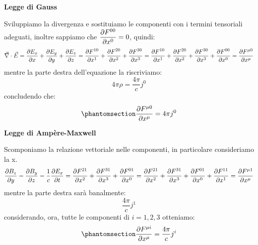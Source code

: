 \textbf{Legge di Gauss}

Sviluppiamo la divergenza e sostituiamo le componenti con i termini tensoriali adeguati, inoltre sappiamo che $\dfrac{\partial F\indices{^{00}}}{\partial x^0}=0$, quindi:
\begin{equation*}
    \Vec{\nabla}\cdot\Vec{E}=\dfrac{\partial E_x}{\partial x}+\dfrac{\partial E_y}{\partial y}+\dfrac{\partial E_z}{\partial z}=\dfrac{\partial F\indices{^{10}}}{\partial x^1}+\dfrac{\partial F\indices{^{20}}}{\partial x^2}+\dfrac{\partial F\indices{^{30}}}{\partial x^3}=\dfrac{\partial F\indices{^{10}}}{\partial x^1}+\dfrac{\partial F\indices{^{20}}}{\partial x^2}+\dfrac{\partial F\indices{^{30}}}{\partial x^3}+\dfrac{\partial F\indices{^{00}}}{\partial x^0}=\dfrac{\partial F\indices{^{\mu0}}}{\partial x^\mu}
\end{equation*} 
mentre la parte destra dell'equazione la riscriviamo:
\begin{equation*}
    4\pi\rho=\dfrac{4\pi}{c}j^0
\end{equation*} 
concludendo che:
\begin{equation}\phantomsection\label{eq:leg_gauss}
    \dfrac{\partial F\indices{^{\mu0}}}{\partial x^\mu}=4\pi j^0
\end{equation} 

\textbf{Legge di Ampère-Maxwell}

Scomponiamo la relazione vettoriale nelle componenti, in particolare consideriamo la x.
\begin{equation*}
   \dfrac{\partial B_z}{\partial y}-\dfrac{\partial B_y}{\partial z}-\dfrac{1}{c}\dfrac{\partial E_x}{\partial t}=\dfrac{\partial F\indices{^{21}}}{\partial x^2}+\dfrac{\partial F\indices{^{31}}}{\partial x^3}+\dfrac{\partial F\indices{^{01}}}{\partial x^0}=\dfrac{\partial F\indices{^{21}}}{\partial x^2}+\dfrac{\partial F\indices{^{31}}}{\partial x^3}+\dfrac{\partial F\indices{^{01}}}{\partial x^0}+\dfrac{\partial F\indices{^{11}}}{\partial x^1}=\dfrac{\partial F\indices{^{\mu1}}}{\partial x^\mu}
\end{equation*}
mentre la parte destra sarà banalmente:
\begin{equation*}
    \dfrac{4\pi}{c}j^1
\end{equation*}
considerando, ora, tutte le componenti di $i=1,2,3$ otteniamo:
\begin{equation}\phantomsection\label{eq:leg_am-ma}
    \dfrac{\partial F\indices{^{\mu i}}}{\partial x^\mu}=\dfrac{4\pi}{c}j^i
\end{equation} 

